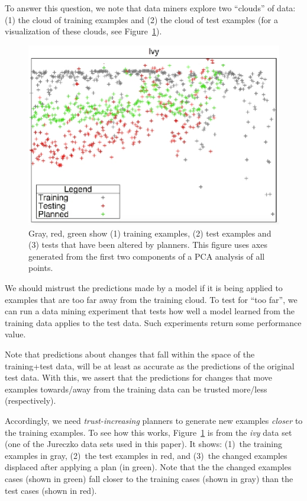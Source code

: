 \documentclass{sig-alternate}
\newcommand{\fig}[1]{Figure~\ref{fig:#1}}
\begin{document}
To answer this question, we note
that data miners explore two  ``clouds'' of data: (1) the cloud of training examples and (2) the  cloud   of test examples
(for a visualization of these clouds, see \fig{howxy}).
\begin{figure}[!t]
  \includegraphics[width=\linewidth]{figs/2d.eps} 
\caption{Gray, red, green show (1) training examples, (2) test examples and 
  (3) tests that have been altered by planners.
  This figure uses axes generated from the first two components of a PCA analysis of all points. 
}\label{fig:howxy}
\end{figure}
We should mistrust the predictions made by a  model   if it is being applied to examples  that are
too far away from the
training cloud.
To test for ``too far'', we can run a data mining experiment that tests how well
a model learned from the training data applies to the test data. Such experiments return some performance value.

Note that predictions  about changes that  fall within the space of the training+test data, will be at least
as accurate as the predictions of the original test data. With this, we assert that the predictions for changes that move examples towards/away from the training data can be trusted more/less (respectively).

Accordingly, we need {\em trust-increasing} planners to generate new examples {\em closer} to the
training examples.  To see how this works, 
 \fig{howxy} is from the {\em ivy} data
set (one of the Jureczko data sets used in this paper). It shows: (1)~the training examples in gray, (2)~the test examples in red, and (3)~the
changed  examples displaced after applying a plan (in green).
 Note that the  the   changed examples
cases  (shown in green)  fall closer to the training cases (shown in gray) than
the test cases (shown in red). 
\end{document}
